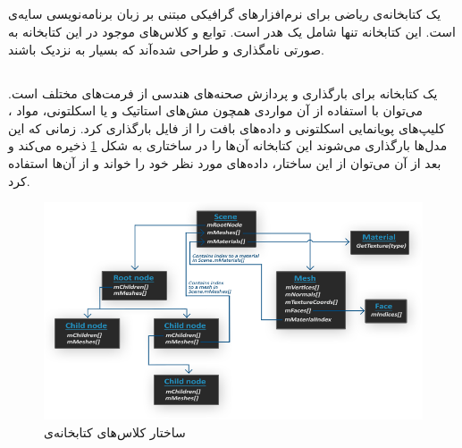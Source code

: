 \subsection{}
یک کتابخانه‌ی ریاضی برای نرم‌افزارهای گرافیکی مبتنی بر زبان برنامه‌نویسی سایه‌ی 
است. این کتابخانه تنها شامل یک هدر 
است.
توابع و کلاس‌های موجود در این کتابخانه به صورتی نامگذاری و طراحی شده‌آند که بسیار به 
 نزدیک باشند.


 \subsection{}

 یک کتابخانه برای بارگذاری و پردازش صحنه‌های هندسی از فرمت‌های مختلف است.
 می‌توان با استفاده از آن مواردی همچون مش‌های استاتیک و یا اسکلتونی، مواد 
 ، کلیپ‌های پویانمایی اسکلتونی و داده‌‌های بافت را از فایل بارگذاری کرد.
زمانی که این مدل‌ها بارگذاری می‌شوند این کتابخانه آن‌ها را در ساختاری به شکل
\ref{fig:Assimp}
 ذخیره می‌کند و بعد از آن می‌توان از این ساختار، داده‌های مورد نظر خود را خواند و از آن‌ها استفاده کرد.
\cite{Assimp} \cite{LearnOpenGL_Assimp}

\begin{figure}[ht]
	\centerline{\includegraphics[width=\textwidth,height=\textheight,keepaspectratio]{Figures/Ch5/assimp_structure.png}}

	\caption{ساختار کلاس‌های کتابخانه‌ی  \cite{LearnOpenGL_Assimp}}
	\label{fig:Assimp}
  \end{figure}
  


  
\subsection{}

